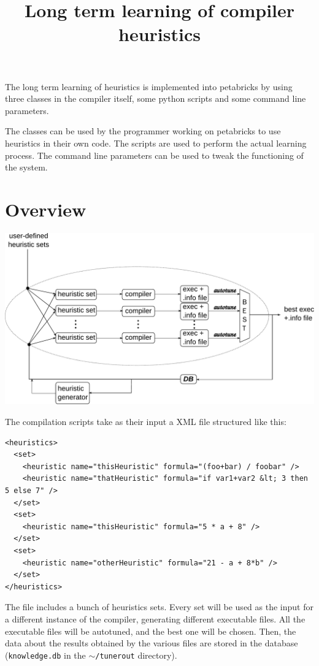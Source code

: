 \documentclass{article}
\title{Long term learning of compiler heuristics}
\begin{document}
\maketitle

The long term learning of heuristics is implemented into petabricks by using three classes in the compiler itself, some python scripts and some command line parameters.

The classes can be used by the programmer working on petabricks to use heuristics in their own code.
The scripts are used to perform the actual learning process.
The command line parameters can be used to tweak the functioning of the system.

\section{Overview}
\includegraphics[width=\textwidth]{heurArchitecture}

The compilation scripts take as their input a XML file structured like this:
\begin{verbatim}
<heuristics>
  <set>
    <heuristic name="thisHeuristic" formula="(foo+bar) / foobar" />
    <heuristic name="thatHeuristic" formula="if var1+var2 &lt; 3 then 5 else 7" />
  </set>
  <set>
    <heuristic name="thisHeuristic" formula="5 * a + 8" />
  </set>
  <set>
    <heuristic name="otherHeuristic" formula="21 - a + 8*b" />
  </set>  
</heuristics>
\end{verbatim}

The file includes a bunch of heuristics sets.
Every set will be used as the input for a  different instance of the compiler, generating different executable files. All the executable files will be autotuned, and the best one will be chosen.
Then, the data about the results obtained by the various files are stored in the database (\texttt{knowledge.db} in the \texttt{$\sim$/tunerout} directory).
\end{document}
